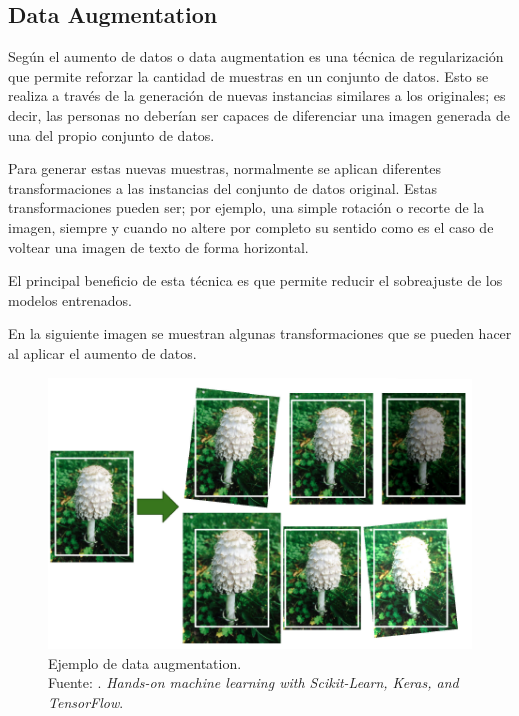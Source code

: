 \subsection{Data Augmentation}

Según \cite{bk_geron2022handml} el aumento de datos o data augmentation es una técnica de regularización que permite reforzar la cantidad de muestras en un conjunto de datos. Esto se realiza a través de la generación de nuevas instancias similares a los originales; es decir, las personas no deberían ser capaces de diferenciar una imagen generada de una del propio conjunto de datos.

Para generar estas nuevas muestras, normalmente se aplican diferentes transformaciones a las instancias del conjunto de datos original. Estas transformaciones pueden ser; por ejemplo, una simple rotación o recorte de la imagen, siempre y cuando no altere por completo su sentido como es el caso de voltear una imagen de texto de forma horizontal. 

El principal beneficio de esta técnica es que permite reducir el sobreajuste de los modelos entrenados. 

En la siguiente imagen se muestran algunas transformaciones que se pueden hacer al aplicar el aumento de datos. 

\begin{figure}[H]
	\begin{center}
		\includegraphics[width=1.00\textwidth]{2/figures/data_aug.PNG}
		\caption[Ejemplo de data augmentation]{Ejemplo de data augmentation. \\
		Fuente: \cite{bk_geron2022handml}. \textit{Hands-on machine learning with Scikit-Learn, Keras, and TensorFlow}.}
		\label{2:fig211}
	\end{center}
\end{figure}

